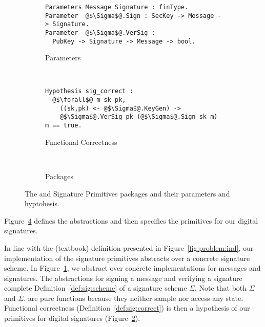 \begin{figure}
	\centering
   \begin{subfigure}[b]{\columnwidth}
    \centering
        \begin{verbatim}
Parameters Message Signature : finType.
Parameter  @$\Sigma$@.Sign : SecKey -> Message -> Signature.
Parameter  @$\Sigma$@.VerSig :
  PubKey -> Signature -> Message -> bool.
	\end{verbatim}
    \caption{Parameters}
    \label{fig:sigprim:params}
  \end{subfigure}
\\[0.3cm]
   \begin{subfigure}[b]{\columnwidth}
    \centering
        \begin{verbatim}
Hypothesis sig_correct :
  @$\forall$@ m sk pk,
    ((sk,pk) <- @$\Sigma$@.KeyGen) ->
    @$\Sigma$@.VerSig pk (@$\Sigma$@.Sign sk m) m == true.
	\end{verbatim}
    \caption{Functional Correctness}
    \label{fig:sigprim:hypo}
  \end{subfigure}
\\[0.3cm]
\begin{subfigure}[b]{\columnwidth}
    \centering
    
    \caption{Packages}
    \label{fig:sigprim:packages}
  \end{subfigure}
	\caption{
    The \real and \ideal Signature Primitives packages
    and their parameters and hyptohesis.
    }
	\label{fig:sigprim}
\end{figure}

%
Figure~\ref{fig:sigprim} defines the abstractions and then
specifies the primitives for our digital signatures.
%

%
In line with the (textbook) definition presented in
Figure~\ref{fig:problem:ind}, our implementation of
the signature primitives abstracts over a concrete
signature scheme.
%
In Figure~\ref{fig:sigprim:params}, we abstract over concrete
implementations for messages and signatures.
%
The abstractions for signing a message and verifying a signature
complete Definition~\ref{def:sig:scheme} of a signature scheme $\Sigma$.
%
Note that both $\Sigma$ and $\Sigma$.
are pure functions because they neither sample nor access any state.
%
Functional correctness (Definition~\ref{def:sig:correct}) is then
a hypothesis of our primitives for digital signatures (Figure~\ref{fig:sigprim:hypo}).
%

